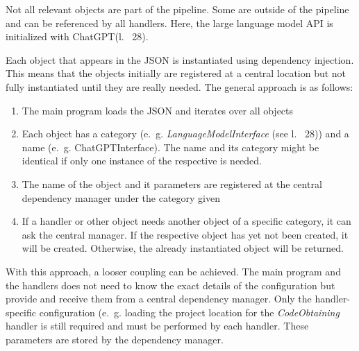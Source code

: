 Not all relevant objects are part of the pipeline. Some are outside of the pipeline and can be referenced by all handlers. Here, the large language model \ac{API} is initialized with ChatGPT(l.~ 28).

Each object that appears in the \ac{JSON} is instantiated using dependency injection. This means that the objects initially are registered at a central location but not fully instantiated until they are really needed. The general approach is as follows:
\begin{enumerate}
    \item The main program loads the \ac{JSON} and iterates over all objects
    \item Each object has a category (e.~g. \textit{LanguageModelInterface} (see l.~ 28)) and a name (e.~g. ChatGPTInterface). The name and its category might be identical if only one instance of the respective is needed. 
    \item The name of the object and it parameters are registered at the central dependency manager under the category given
    \item If a handler or other object needs another object of a specific category, it can ask the central manager. If the respective object has  yet not been created, it will be created. Otherwise, the already instantiated object will be returned. 
\end{enumerate}
With this approach, a looser coupling can be achieved. The main program and the handlers does not need to know the exact details of the configuration but provide and receive them from a central dependency manager. Only the handler-specific configuration (e.~g. loading the project location  for the \textit{CodeObtaining} handler is still required and must be performed by each handler. These parameters are stored by the dependency manager. 